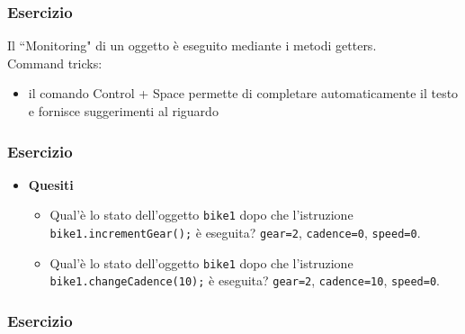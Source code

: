 \documentclass{article}
\theoremstyle{definition}
\begin{document}
\subsubsection{Esercizio}





Il ``Monitoring" di un oggetto \`e eseguito mediante i metodi getters.\\
Command tricks:
\begin{itemize}
\item il comando Control + Space permette di completare automaticamente il testo e fornisce suggerimenti al riguardo
\end{itemize}






\subsubsection{Esercizio}






\begin{itemize}
\item \textbf{Quesiti}
\begin{itemize}
\item Qual'\`e lo stato dell'oggetto \texttt{bike1} dopo che l'istruzione \texttt{bike1.incrementGear();} \`e eseguita? 
\texttt{gear=2}, \texttt{cadence=0}, \texttt{speed=0}.
\item Qual'\`e lo stato dell'oggetto  \texttt{bike1} dopo che l'istruzione \texttt{bike1.changeCadence(10);} \`e eseguita? 
\texttt{gear=2}, \texttt{cadence=10}, \texttt{speed=0}.
\end{itemize}
\end{itemize}

\subsubsection{Esercizio}
\end{document}
